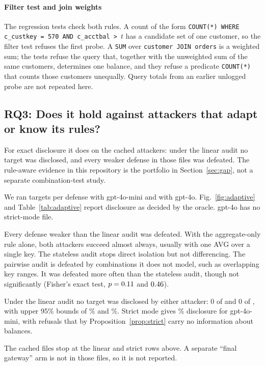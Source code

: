 \documentclass[sigconf,nonacm]{acmart}
\begin{document}
\paragraph{Filter test and join weights}\label{sec:probes}
The regression tests check both rules. A count of the form \texttt{COUNT(*) WHERE c\_custkey = 570 AND c\_acctbal > $t$} has a candidate set of one customer, so the filter test refuses the first probe. A \texttt{SUM} over \texttt{customer JOIN orders} is a weighted sum; the tests refuse the query that, together with the unweighted sum of the same customers, determines one balance, and they refuse a predicate \texttt{COUNT(*)} that counts those customers unequally. Query totals from an earlier unlogged probe are not repeated here.

\subsection{RQ3: Does it hold against attackers that adapt or know its rules?}\label{sec:adaptive}
For exact disclosure it does on the cached attackers: under the linear audit no target was disclosed, and every weaker defense in those files was defeated. The rule-aware evidence in this repository is the portfolio in Section~\ref{sec:gap}, not a separate combination-test study.

We ran \Nadvnm{} targets per defense with gpt-4o-mini and \Nadvno{} with gpt-4o. Fig.~\ref{fig:adaptive} and Table~\ref{tab:adaptive} report disclosure as decided by the oracle. gpt-4o has no strict-mode file.

Every defense weaker than the linear audit was defeated. With the aggregate-only rule alone, both attackers succeed almost always, usually with one AVG over a single key. The stateless audit stops direct isolation but not differencing. The pairwise audit is defeated by combinations it does not model, such as overlapping key ranges. It was defeated more often than the stateless audit, though not significantly (Fisher's exact test, $p=0.11$ and $0.46$).

Under the linear audit no target was disclosed by either attacker: 0 of \Nadvnm{} and 0 of \Nadvno{}, with upper 95\% bounds of \Nadvmlinearhi\% and \Nadvolinearhi\%. Strict mode gives \Nadvmstrict\% disclosure for gpt-4o-mini, with refusals that by Proposition~\ref{prop:strict} carry no information about balances.

The cached files stop at the linear and strict rows above. A separate ``final gateway'' arm is not in those files, so it is not reported.
\end{document}
